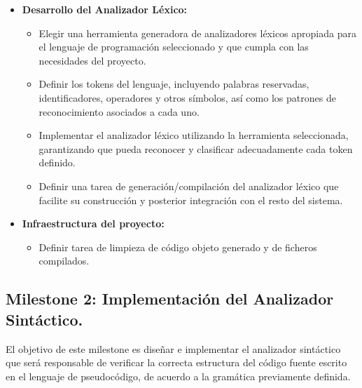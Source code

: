 \begin{itemize}
    \item \textbf{Desarrollo del Analizador Léxico:}
    \begin{itemize}
        \item Elegir una herramienta generadora de analizadores léxicos apropiada para el lenguaje de programación seleccionado y que cumpla con las necesidades del proyecto.
        \item Definir los tokens del lenguaje, incluyendo palabras reservadas, identificadores, operadores y otros símbolos, así como los patrones de reconocimiento asociados a cada uno.
        \item Implementar el analizador léxico utilizando la herramienta seleccionada, garantizando que pueda reconocer y clasificar adecuadamente cada token definido.
        \item Definir una tarea de generación/compilación del analizador léxico que facilite su construcción y posterior integración con el resto del sistema.
    \end{itemize}

    \item \textbf{Infraestructura del proyecto:}
    \begin{itemize}
        \item Definir tarea de limpieza de código objeto generado y de ficheros compilados.
    \end{itemize}

\end{itemize}

\subsection{Milestone 2: Implementación del Analizador Sintáctico.}
El objetivo de este milestone es diseñar e implementar el analizador sintáctico que será responsable de verificar la correcta estructura del código fuente escrito en el lenguaje de pseudocódigo, de acuerdo a la gramática previamente definida.

